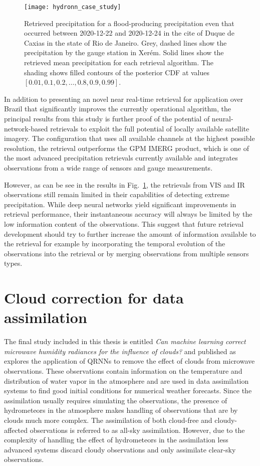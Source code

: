 \begin{figure}
  \centering
  \texttt{[image: hydronn\_case\_study]}
  \label{fig:contributions:hydronn}
  \caption{
      Retrieved precipitation for a flood-producing precipitation even that
      occurred between 2020-12-22 and 2020-12-24 in the cite of Duque de Caxias
      in the state of Rio de Janeiro. Grey, dashed lines show the precipitation
      by the gauge station in Xer\'em. Solid lines show the retrieved mean
      precipitation for each retrieval algorithm. The shading shows filled
      contours of the posterior CDF at values $[0.01, 0.1, 0.2, \ldots, 0.8,
        0.9, 0.99]$.
    }
\end{figure}

In addition to presenting an novel near real-time retrieval for application over
Brazil that significantly improves the currently operational algorithm, the
principal results from this study is further proof of the potential of
neural-network-based retrievals to exploit the full potential of locally
available satellite imagery. The configuration that uses all available channels
at the highest possible resolution, the retrieval outperforms the GPM IMERG
product, which is one of the most advanced precipitation retrievals
currently available and integrates observations from a wide range of
sensors and gauge measurements.

However, as can be see in the results in Fig.~\ref{fig:contributions:hydronn},
the retrievals from VIS and IR observations still remain limited in their
capabilities of detecting extreme precipitation. While deep neural networks
yield significant improvements in retrieval performance, their instantaneous
accuracy will always be limited by the low information content of the
observations. This suggest that future retrieval development should try to
further increase the amount of information available to the retrieval for
example by incorporating the temporal evolution of the observations into the
retrieval or by merging observations from multiple sensors types.

\section{Cloud correction for data assimilation}

The final study included in this thesis is entitled
\textit{
  Can machine learning correct microwave humidity radiances for the influence of clouds?
  }
and published as \citep{kaur21} explores the application of QRNNs to
remove the effect of clouds from microwave observations. These observations
contain information on the temperature and distribution of water vapor in the
atmosphere and are used in data assimilation systems to find good initial
conditions for numerical weather forecasts. Since the assimilation usually
requires simulating the observations, the presence of hydrometeors in the
atmosphere makes handling of observations that are by clouds much more complex.
The assimilation of both cloud-free and cloudy-affected observations is referred
to as all-sky assimilation. However, due to the complexity of handling the
effect of hydrometeors in the assimilation less advanced systems discard cloudy
observations and only assimilate clear-sky observations.

